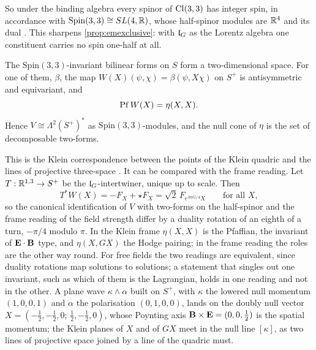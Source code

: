 So under the binding algebra every spinor of $\mathrm{Cl}(3,3)$ has integer spin, in accordance with $\mathrm{Spin}(3,3)\cong SL(4,\mathbb{R})$, whose
half-spinor modules are $\mathbb{R}^4$ and its dual \cite{Porteous}. This sharpens \cref{prop:emexclusive}: with $\mathfrak l_G$ as the Lorentz algebra
one constituent carries no spin one-half at all.

\begin{theorem}
\label{thm:klein}
The $\mathrm{Spin}(3,3)$-invariant bilinear forms on $S$ form a two-dimensional space. For one of them, $\beta$, the map
$W(X)(\psi,\chi)=\beta(\psi,X\chi)$ on $S^+$ is antisymmetric and equivariant, and
\[
\operatorname{Pf} W(X)=\eta(X,X).
\]
Hence $V\cong\Lambda^2(S^+)^*$ as $\mathrm{Spin}(3,3)$-modules, and the null cone of $\eta$ is the set of decomposable two-forms.
\end{theorem}

This is the Klein correspondence between the points of the Klein quadric and the lines of projective three-space
\cite{WardWells}. It can be compared with the frame reading. Let $T:\mathbb{R}^{1,3}\to S^+$ be the $\mathfrak l_G$-intertwiner, unique up to scale. Then
\[
T^*W(X)=-F_X+\star F_X=\sqrt2\,F_{e^{3\pi G/4}X}\qquad\text{for all }X,
\]
so the canonical identification of $V$ with two-forms on the half-spinor and the frame reading of the field strength differ by a
duality rotation of an eighth of a turn, $-\pi/4$ modulo $\pi$. In the Klein frame $\eta(X,X)$ is the Pfaffian, the invariant of
$\mathbf E\cdot\mathbf B$ type, and $\eta(X,GX)$ the Hodge pairing; in the frame reading the roles are the other way round. For free fields the two
readings are equivalent, since duality rotations map solutions to solutions; a statement that singles out one invariant, such as which
of them is the Lagrangian, holds in one reading and not in the other. A plane wave $\kappa\wedge\alpha$ built on $S^+$, with $\kappa$ the
lowered null momentum $(1,0,0,1)$ and $\alpha$ the polarisation $(0,1,0,0)$, lands on the doubly null vector
$X=(-\tfrac12,-\tfrac12,0;\,\tfrac12,-\tfrac12,0)$, whose Poynting axis $\mathbf B\times\mathbf E=(0,0,\tfrac12)$ is the spatial momentum; the Klein
planes of $X$ and of $GX$ meet in the null line $[\kappa]$, as two lines of projective space joined by a line of the quadric must.

